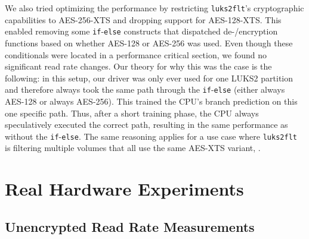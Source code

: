 

We also tried optimizing the performance by restricting \texttt{luks2flt}'s cryptographic capabilities to AES-256-XTS and dropping support for AES-128-XTS. This enabled removing some \texttt{if}-\texttt{else} constructs that dispatched de-/encryption functions based on whether AES-128 or AES-256 was used. Even though these conditionals were located in a performance critical section, we found no significant read rate changes. Our theory for why this was the case is the following: in this setup, our driver was only ever used for one LUKS2 partition and therefore always took the same path through the \texttt{if}-\texttt{else} (either always AES-128 or always AES-256). This trained the CPU's branch prediction on this one specific path. Thus, after a short training phase, the CPU always speculatively executed the correct path, resulting in the same performance as without the \texttt{if}-\texttt{else}. The same reasoning applies for a use case where \texttt{luks2flt} is filtering multiple volumes that all use the same AES-XTS variant, .

\section{Real Hardware Experiments}
\label{chap:performance.hwexperiments}

\subsection{Unencrypted Read Rate Measurements}
\label{chap:performance.hwexperiments.unencrypted}

